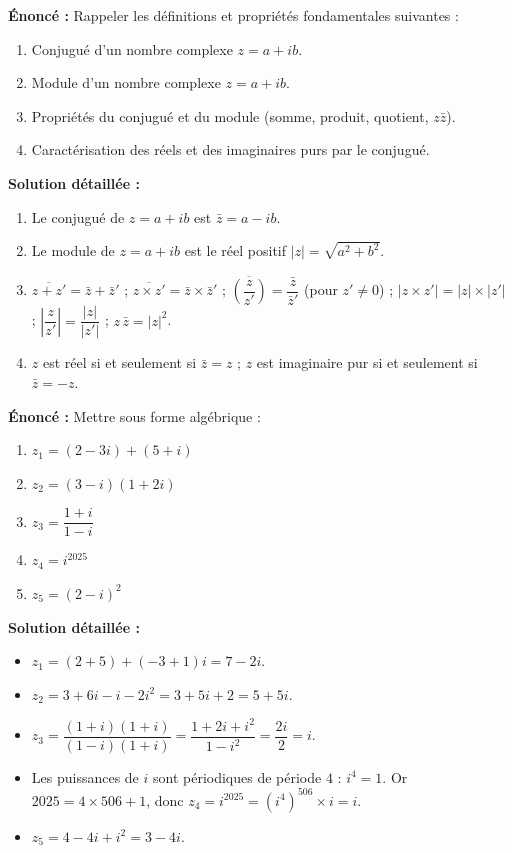 \documentclass[11pt]{article}
\begin{document}
\begin{corrige}
\textbf{Énoncé :} Rappeler les définitions et propriétés fondamentales suivantes :
\begin{enumerate}
\item Conjugué d'un nombre complexe $z = a+ib$.
\item Module d'un nombre complexe $z = a+ib$.
\item Propriétés du conjugué et du module (somme, produit, quotient, $z\bar{z}$).
\item Caractérisation des réels et des imaginaires purs par le conjugué.
\end{enumerate}
\tcblower
\textbf{Solution détaillée :}
\begin{enumerate}
\item Le conjugué de $z = a+ib$ est $\bar{z} = a - ib$.
\item Le module de $z = a+ib$ est le réel positif $|z| = \sqrt{a^2+b^2}$.
\item $\overline{z+z'} = \bar{z} + \bar{z}'$ ; $\overline{z \times z'} = \bar{z} \times \bar{z}'$ ; $\overline{\left(\dfrac{z}{z'}\right)} = \dfrac{\bar{z}}{\bar{z}'}$ (pour $z'\neq 0$) ; $|z \times z'| = |z| \times |z'|$ ; $\left|\dfrac{z}{z'}\right| = \dfrac{|z|}{|z'|}$ ; $z\,\bar{z} = |z|^2$.
\item $z$ est réel si et seulement si $\bar{z} = z$ ; $z$ est imaginaire pur si et seulement si $\bar{z} = -z$.
\end{enumerate}
\end{corrige}

\begin{corrige}
\textbf{Énoncé :} Mettre sous forme algébrique :
\begin{enumerate}
\item $z_1 = (2-3i) + (5+i)$
\item $z_2 = (3-i)(1+2i)$
\item $z_3 = \dfrac{1+i}{1-i}$
\item $z_4 = i^{2025}$
\item $z_5 = (2-i)^2$
\end{enumerate}
\tcblower
\textbf{Solution détaillée :}
\begin{itemize}
\item $z_1 = (2+5) + (-3+1)i = 7 - 2i$.
\item $z_2 = 3 + 6i - i - 2i^2 = 3 + 5i + 2 = 5 + 5i$.
\item $z_3 = \dfrac{(1+i)(1+i)}{(1-i)(1+i)} = \dfrac{1 + 2i + i^2}{1 - i^2} = \dfrac{2i}{2} = i$.
\item Les puissances de $i$ sont périodiques de période $4$ : $i^4 = 1$. Or $2025 = 4 \times 506 + 1$, donc $z_4 = i^{2025} = (i^4)^{506} \times i = i$.
\item $z_5 = 4 - 4i + i^2 = 3 - 4i$.
\end{itemize}
\end{corrige}
\end{document}
